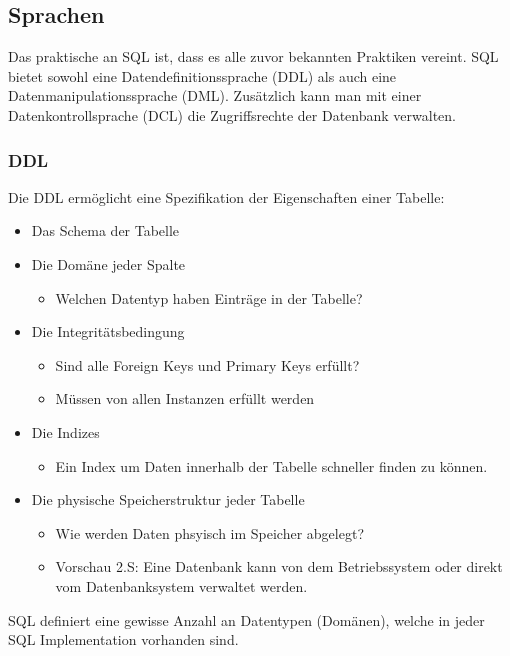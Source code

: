 \documentclass{article}
\begin{document}
 	\subsection{Sprachen}
 	Das praktische an SQL ist, dass es alle zuvor bekannten Praktiken vereint. SQL bietet sowohl eine Datendefinitionssprache (DDL) als auch eine Datenmanipulationssprache (DML). Zusätzlich kann man mit einer Datenkontrollsprache (DCL) die Zugriffsrechte der Datenbank verwalten.
 	\subsubsection{DDL}
 	Die DDL ermöglicht eine Spezifikation der Eigenschaften einer Tabelle:
 	\begin{itemize}
 		\item{Das Schema der Tabelle}
 		\item{Die Domäne jeder Spalte}
 		\begin{itemize}
 			\item{Welchen Datentyp haben Einträge in der Tabelle?}
 		\end{itemize}
 		\item{Die Integritätsbedingung}
 		\begin{itemize}
 			\item{Sind alle Foreign Keys und Primary Keys erfüllt?}
 			\item{Müssen von allen Instanzen erfüllt werden}
 		\end{itemize}
 		\item{Die Indizes}
 		\begin{itemize}
 			\item{Ein Index um Daten innerhalb der Tabelle schneller finden zu können.}
 		\end{itemize}
 		\item{Die physische Speicherstruktur jeder Tabelle}
 		\begin{itemize}
 			\item{Wie werden Daten phsyisch im Speicher abgelegt?}
 			\item{Vorschau 2.S: Eine Datenbank kann von dem Betriebssystem oder direkt vom Datenbanksystem verwaltet werden.}
 		\end{itemize}
 	\end{itemize}
 	SQL definiert eine gewisse Anzahl an Datentypen (Domänen), welche in jeder SQL Implementation vorhanden sind. \\
\end{document}
